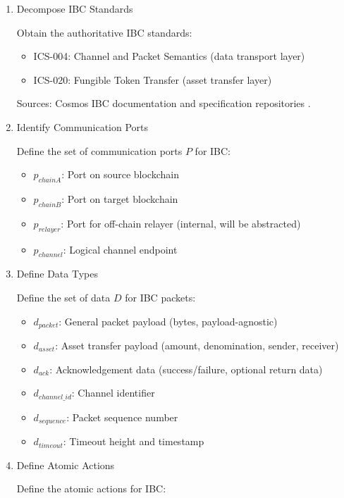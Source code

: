 \begin{enumerate}
\item
  Decompose IBC Standards

  Obtain the authoritative IBC standards:

  \begin{itemize}
      \item ICS-004: Channel and Packet Semantics (data transport layer)
      \item ICS-020: Fungible Token Transfer (asset transfer layer)
  \end{itemize}

  Sources: Cosmos IBC documentation and specification repositories
  \citep{cosmos2024ibcintro} \citep{cosmos_ibc}.
\item
  Identify Communication Ports

  Define the set of communication ports \(P\) for IBC:

  \begin{itemize}
      \item \(p_{chainA}\): Port on source blockchain
      \item \(p_{chainB}\): Port on target blockchain
      \item \(p_{relayer}\): Port for off-chain relayer (internal, will be abstracted)
      \item \(p_{channel}\): Logical channel endpoint
  \end{itemize}
\item
  Define Data Types

  Define the set of data \(D\) for IBC packets:

  \begin{itemize}
      \item \(d_{packet}\): General packet payload (bytes, payload-agnostic)
      \item \(d_{asset}\): Asset transfer payload (amount, denomination, sender, receiver)
      \item \(d_{ack}\): Acknowledgement data (success/failure, optional return data)
      \item \(d_{channel\_id}\): Channel identifier
      \item \(d_{sequence}\): Packet sequence number
      \item \(d_{timeout}\): Timeout height and timestamp
  \end{itemize}
\item
  Define Atomic Actions

  Define the atomic actions for IBC:


\end{enumerate}
